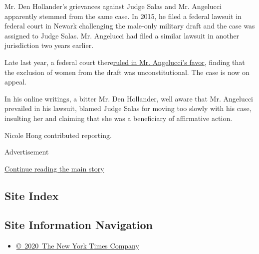 Mr. Den Hollander's grievances against Judge Salas and Mr. Angelucci
apparently stemmed from the same case. In 2015, he filed a federal
lawsuit in federal court in Newark challenging the male-only military
draft and the case was assigned to Judge Salas. Mr. Angelucci had filed
a similar lawsuit in another jurisdiction two years earlier.

Late last year, a federal court
there\href{https://www.nytimes.com/2019/02/24/us/military-draft-men-unconstitutional.html}{ruled
in Mr. Angelucci's favor}, finding that the exclusion of women from the
draft was unconstitutional. The case is now on appeal.

In his online writings, a bitter Mr. Den Hollander, well aware that Mr.
Angelucci prevailed in his lawsuit, blamed Judge Salas for moving too
slowly with his case, insulting her and claiming that she was a
beneficiary of affirmative action.

Nicole Hong contributed reporting.

Advertisement

\protect\hyperlink{after-bottom}{Continue reading the main story}

\hypertarget{site-index}{%
\subsection{Site Index}\label{site-index}}

\hypertarget{site-information-navigation}{%
\subsection{Site Information
Navigation}\label{site-information-navigation}}

\begin{itemize}
\tightlist
\item
  \href{https://help.nytimes.com/hc/en-us/articles/115014792127-Copyright-notice}{©~2020~The
  New York Times Company}
\end{itemize}

